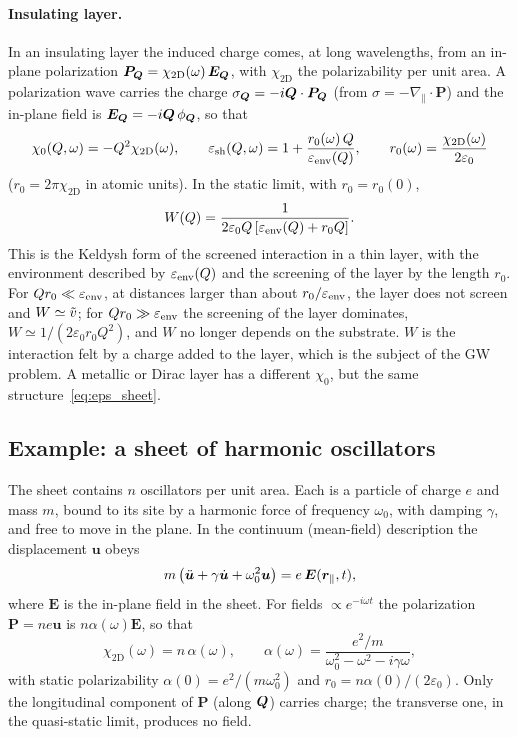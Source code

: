 \documentclass[10pt,a4paper]{paper}
\begin{document}
\paragraph{Insulating layer.} In an insulating layer the induced charge comes, at long wavelengths, from an in-plane
polarization $\bm{P}_{\bm{Q}} = \chi_{2\mathrm{D}}(\omega)\,\bm{E}_{\bm{Q}}$, with $\chi_{2\mathrm{D}}$ the polarizability
per unit area. A polarization wave carries the charge $\sigma_{\bm{Q}} = -i\bm{Q}\cdot\bm{P}_{\bm{Q}}$ (from
$\sigma = -\nabla_{\parallel}\cdot\bm{P}$) and the in-plane field is $\bm{E}_{\bm{Q}} = -i\bm{Q}\,\phi_{\bm{Q}}$, so that
\begin{equation}
\chi_0(Q,\omega) = -Q^2\chi_{2\mathrm{D}}(\omega) , \qquad
\varepsilon_{\mathrm{sh}}(Q,\omega) = 1 + \frac{r_0(\omega)\,Q}{\varepsilon_{\mathrm{env}}(Q)} , \qquad
r_0(\omega) = \frac{\chi_{2\mathrm{D}}(\omega)}{2\varepsilon_0}
\label{eq:eps_insulator}
\end{equation}
($r_0 = 2\pi\chi_{2\mathrm{D}}$ in atomic units). In the static limit, with $r_0 = r_0(0)$,
\begin{equation}
W(Q) = \frac{1}{2\varepsilon_0 Q\left[\varepsilon_{\mathrm{env}}(Q) + r_0Q\right]} .
\label{eq:W_keldysh}
\end{equation}
This is the Keldysh form of the screened interaction in a thin layer, with the environment described by $\varepsilon_{\mathrm{env}}(Q)$
and the screening of the layer by the length $r_0$. For $Qr_0 \ll \varepsilon_{\mathrm{env}}$, at distances larger than about
$r_0/\varepsilon_{\mathrm{env}}$, the layer does not screen and $W \simeq \tilde{v}$; for $Qr_0 \gg \varepsilon_{\mathrm{env}}$ the screening of the layer
dominates, $W \simeq 1/(2\varepsilon_0 r_0Q^2)$, and $W$ no longer depends on the substrate. $W$ is the interaction
felt by a charge added to the layer, which is the subject of the GW problem. A metallic or Dirac layer has a
different $\chi_0$, but the same structure~\eqref{eq:eps_sheet}.

\subsection{Example: a sheet of harmonic oscillators}
\label{sec:oscillators}

The sheet contains $n$ oscillators per unit area. Each is a particle of charge $e$ and mass $m$, bound to its site
by a harmonic force of frequency $\omega_0$, with damping $\gamma$, and free to move in the plane. In the continuum
(mean-field) description the displacement $\bm{u}$ obeys
\begin{equation}
m\left(\ddot{\bm{u}} + \gamma\dot{\bm{u}} + \omega_0^2\bm{u}\right) = e\,\bm{E}(\bm{r}_{\parallel}, t) ,
\label{eq:eom}
\end{equation}
where $\bm{E}$ is the in-plane field in the sheet. For fields $\propto e^{-i\omega t}$ the polarization
$\bm{P} = ne\bm{u}$ is $n\alpha(\omega)\bm{E}$, so that
\begin{equation}
\chi_{2\mathrm{D}}(\omega) = n\,\alpha(\omega) , \qquad
\alpha(\omega) = \frac{e^2/m}{\omega_0^2 - \omega^2 - i\gamma\omega} ,
\label{eq:alpha}
\end{equation}
with static polarizability $\alpha(0) = e^2/(m\omega_0^2)$ and $r_0 = n\alpha(0)/(2\varepsilon_0)$. Only the
longitudinal component of $\bm{P}$ (along $\bm{Q}$) carries charge; the transverse one, in the quasi-static limit,
produces no field.
\end{document}
